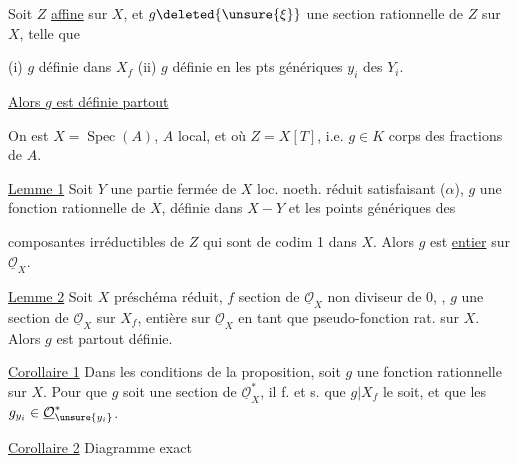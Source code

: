 Soit $Z$ \uline{affine} sur $X$, et $g\deleted{\unsure{\xi}}$ une section rationnelle de $Z$ sur $X$, telle que

(i) $g$ définie dans $X_f$ (ii) $g$ définie en les pts génériques $y_i$ des $Y_i$.

\uline{Alors $g$ est définie partout}

On est  $X=\operatorname{Spec}(A)$, $A$ local, et où $Z=X[T]$, i.e. $g\in K$ corps des fractions de $A$.

\uline{Lemme 1} Soit $Y$ une partie fermée de $X$ loc. noeth. réduit satisfaisant ($\alpha$),  $g$ une  fonction rationnelle de $X$, définie dans $X-Y$ et les points génériques des

composantes irréductibles de $Z$ qui sont de codim 1 dans $X$. Alors $g$ est \uline{entier} sur $\underline{\mathcal O}_X$.

\uline{Lemme 2} Soit   $X$  préschéma  réduit, $f$ section de $\underline{\mathcal O}_X$ non diviseur de 0, , $g$ une section de $\underline{\mathcal O}_X$ sur $X_f$, entière sur $\underline{\mathcal O}_X$ en tant que  pseudo-fonction rat. sur $X$. Alors $g$ est partout définie.


\uline{Corollaire 1} Dans les conditions de la proposition, soit $g$ une fonction rationnelle sur $X$. Pour que $g$ soit une section de $\underline{\mathcal O}_X^*$, il f. et s. que $g|X_f$ le soit, et que  les $g_{y_i}\in\underline{\mathcal O}_{\unsure{y_i}}^*$. 
\margin{$\longrightarrow$}

\uline{Corollaire 2} Diagramme exact

